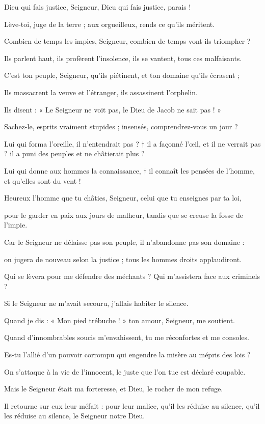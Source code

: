 \item Dieu qui fais justice, Seigneur, Dieu qui fais justice, parais !
\item Lève-toi, juge de la terre ; aux orgueilleux, rends ce qu'ils méritent.
\item Combien de temps les impies, Seigneur, combien de temps vont-ils triompher ?
\item Ils parlent haut, ils profèrent l'insolence, ils se vantent, tous ces malfaisants.
\item C'est ton peuple, Seigneur, qu'ils piétinent, et ton domaine qu'ils écrasent ;
\item Ils massacrent la veuve et l'étranger, ils assassinent l'orphelin.
\item Ils disent : « Le Seigneur ne voit pas, le Dieu de Jacob ne sait pas ! »
\item Sachez-le, esprits vraiment stupides ; insensés, comprendrez-vous un jour ?
\item Lui qui forma l'oreille, il n'entendrait pas ? † il a façonné l'œil, et il ne verrait pas ? il a puni des peuples et ne châtierait plus ? 
\item Lui qui donne aux hommes la connaissance, † il connaît les pensées de l'homme, et qu'elles sont du vent !
\item Heureux l'homme que tu châties, Seigneur, celui que tu enseignes par ta loi,
\item pour le garder en paix aux jours de malheur, tandis que se creuse la fosse de l'impie.
\item Car le Seigneur ne délaisse pas son peuple, il n'abandonne pas son domaine :
\item on jugera de nouveau selon la justice ; tous les hommes droits applaudiront.
\item Qui se lèvera pour me défendre des méchants ? Qui m'assistera face aux criminels ?
\item Si le Seigneur ne m'avait secouru, j'allais habiter le silence.
\item Quand je dis : « Mon pied trébuche ! » ton amour, Seigneur, me soutient.
\item Quand d'innombrables soucis m'envahissent, tu me réconfortes et me consoles.
\item Es-tu l'allié d'un pouvoir corrompu qui engendre la misère au mépris des lois ?
\item On s'attaque à la vie de l'innocent, le juste que l'on tue est déclaré coupable.
\item Mais le Seigneur était ma forteresse, et Dieu, le rocher de mon refuge.
\item Il retourne sur eux leur méfait : pour leur malice, qu'il les réduise au silence, qu'il les réduise au silence, le Seigneur notre Dieu.
